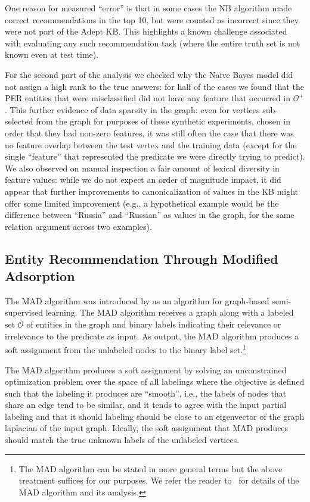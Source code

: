 \documentclass[paper=a4,fontsize=11pt]{scrartcl}
\newcommand{\ie}{i.e.,\xspace}
\numberwithin{equation}{section}    %
\numberwithin{figure}{section}      %
\numberwithin{table}{section}       %
\begin{document}
One reason for measured ``error'' is that in some cases the NB
algorithm made correct recommendations in the top 10, but were counted
as incorrect since they were not part of the Adept KB. This highlights
a known challenge associated with evaluating any such recommendation
task (where the entire truth set is not known even at test time).

For the second part of the analysis we checked why the Naive Bayes
model did not assign a high rank to the true answers: for half of the
cases we found that the \textsc{PER} entities that were misclassified
did not have any feature that occurred in $\mathcal{O}^{+}$.  This
further evidence of data sparsity in the graph: even for vertices
sub-selected from the graph for purposes of these synthetic
experiments, chosen in order that they had non-zero features, it was
still often the case that there was no feature overlap between the
test vertex and the training data (except for the single ``feature''
that represented the predicate we were directly trying to predict).
We also observed on manual inspection a fair amount of lexical
diversity in feature values: while we do not expect an order of
magnitude impact, it did appear that further improvements to
canonicalization of values in the KB might offer some limited
improvement (e.g., a hypothetical example would be the difference
between ``Russia'' and ``Russian'' as values in the graph, for the
same relation argument across two examples).


\subsection{Entity Recommendation Through Modified Adsorption}
\label{sec:er-lp}
The MAD algorithm was introduced by \citep{talukdar2009new} as an algorithm
for graph-based semi-supervised learning. The MAD algorithm receives a graph along with
a labeled set $\mathcal{O}$ of entities in the graph and binary labels indicating
their relevance or irrelevance to the predicate as input. As output, the MAD algorithm
produces a soft assignment from the unlabeled nodes to the binary label set.\footnote{The MAD algorithm can be stated in more general terms but the above treatment suffices for our purposes. We refer the reader to~\citep{talukdar2009new} for details of the MAD algorithm
and its analysis.}

The MAD algorithm produces a soft assignment by solving an unconstrained
optimization problem over the space of all labelings where the objective
is defined such that the labeling it produces are ``smooth'', \ie the
labels of nodes that share an edge tend to be similar, and it tends to agree with
the input partial labeling and that it should labeling should be close to an
eigenvector of the graph laplacian of the input graph.
Ideally, the soft assignment that MAD produces should match the true
unknown labels of the unlabeled vertices.
\end{document}
